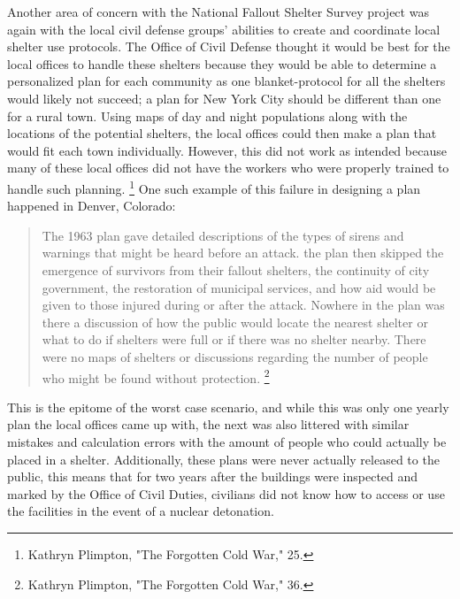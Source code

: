 \documentclass[12pt]{turabian-researchpaper}
\begin{document}
Another area of concern with the National Fallout Shelter Survey project was again with the local civil defense groups' abilities to create and coordinate local shelter use protocols. The Office of Civil Defense thought it would be best for the local offices to handle these shelters because they would be able to determine a personalized plan for each community as one blanket-protocol for all the shelters would likely not succeed; a plan for New York City should be different than one for a rural town. Using maps of day and night populations along with the locations of the potential shelters, the local offices could then make a plan that would fit each town individually. However, this did not work as intended because many of these local offices did not have the workers who were properly trained to handle such planning. \footnote{Kathryn Plimpton, "The Forgotten Cold War," 25.} One such example of this failure in designing a plan happened in Denver, Colorado:

	\begin{quotation}
		The 1963 plan gave detailed descriptions of the types of sirens and warnings that might be heard before an attack. the plan then skipped the emergence of survivors from their fallout shelters, the continuity of city government, the restoration of municipal services, and how aid would be given to those injured during or after the attack. Nowhere in the plan was there a discussion of how the public would locate the nearest shelter or what to do if shelters were full or if there was no shelter nearby. There were no maps of shelters or discussions regarding the number of people who might be found without protection. \footnote{Kathryn Plimpton, "The Forgotten Cold War," 36.}
	\end{quotation}

This is the epitome of the worst case scenario, and while this was only one yearly plan the local offices came up with, the next was also littered with similar mistakes and calculation errors with the amount of people who could actually be placed in a shelter. Additionally, these plans were never actually released to the public, this means that for two years after the buildings were inspected and marked by the Office of Civil Duties, civilians did not know how to access or use the facilities in the event of a nuclear detonation.
\end{document}
